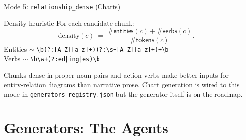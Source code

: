 \documentclass[aspectratio=169, 10pt]{beamer}
\begin{document}
\begin{frame}{Mode 5: \texttt{relationship\_dense} (Charts)}
  \begin{block}{Density heuristic}
    \scriptsize
    For each candidate chunk:
    \[
      \mathrm{density}(c) \;=\; \frac{\#\textsf{entities}(c) + \#\textsf{verbs}(c)}{\#\textsf{tokens}(c)}.
    \]
    Entities $\sim$ \texttt{\textbackslash b(?:[A-Z][a-z]+)(?:\textbackslash s+[A-Z][a-z]+)+\textbackslash b}\\
    Verbs $\sim$ \texttt{\textbackslash b\textbackslash w+(?:ed|ing|es)\textbackslash b}
  \end{block}

  \scriptsize
  Chunks dense in proper-noun pairs and action verbs make better
  inputs for entity-relation diagrams than narrative prose. Chart
  generation is wired to this mode in \texttt{generators\_registry.json}
  but the generator itself is on the roadmap.
\end{frame}

\section{Generators: The Agents}
\end{document}
